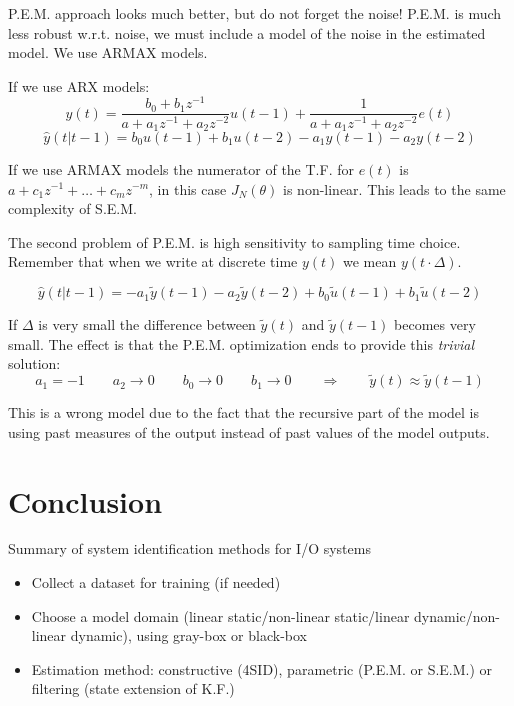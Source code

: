 P.E.M. approach looks much better, but do not forget the noise! P.E.M. is much less robust w.r.t. noise, we must include a model of the noise in the estimated model.
We use ARMAX models.

If we use ARX models:
\[
    y(t) = \frac{b_0+b_1z^{-1}}{a+a_1z^{-1}+a_2z^{-2}}u(t-1) + \frac{1}{a+a_1z^{-1}+a_2z^{-2}}e(t)
\]
\[
    \hat{y}(t|t-1) = b_0u(t-1)+b_1u(t-2) - a_1y(t-1)-a_2y(t-2)
\]

If we use ARMAX models the numerator of the T.F. for $e(t)$ is $a+c_1z^{-1}+\ldots+c_mz^{-m}$, in this case $J_N(\theta)$ is non-linear.
This leads to the same complexity of S.E.M.

The second problem of P.E.M. is high sensitivity to sampling time choice.
Remember that when we write at discrete time $y(t)$ we mean $y(t\cdot \Delta)$.

\[
    \hat{y}(t|t-1) = -a_1\tilde{y}(t-1)-a_2\tilde{y}(t-2) + b_0\tilde{u}(t-1)+b_1\tilde{u}(t-2)
\]

If $\Delta$ is very small the difference between $\tilde{y}(t)$ and $\tilde{y}(t-1)$ becomes very small.
The effect is that the P.E.M. optimization ends to provide this \emph{trivial} solution:
\[
    a_1 = -1 \qquad a_2 \rightarrow 0 \qquad b_0 \rightarrow 0 \qquad b_1 \rightarrow 0 \qquad \Rightarrow \qquad \tilde{y}(t) \approx \tilde{y}(t-1)
\]

This is a wrong model due to the fact that the recursive part of the model is using past measures of the output instead of past values of the model outputs.

\section{Conclusion}

Summary of system identification methods for I/O systems
\begin{figure}[H]
    \centering
\end{figure}

\begin{itemize}
    \item Collect a dataset for training (if needed)
    \item Choose a model domain (linear static/non-linear static/linear dynamic/non-linear dynamic), using gray-box or black-box
    \item Estimation method: constructive (4SID), parametric (P.E.M. or S.E.M.) or filtering (state extension of K.F.)
\end{itemize}

